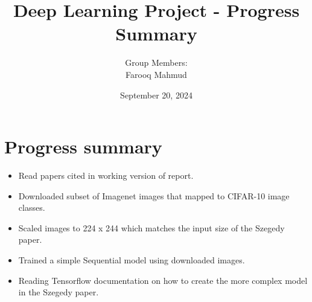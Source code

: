 \documentclass{article}
\title{Deep Learning Project - Progress Summary}
\author{
    Group Members: \\
    Farooq Mahmud
}
\date{September 20, 2024}
\begin{document}
\maketitle

\section{Progress summary}
\begin{itemize}
    \item Read papers cited in working version of report.
    \item Downloaded subset of Imagenet images that mapped to CIFAR-10 image classes. 
    \item Scaled images to 224 x 244 which matches the input size of the Szegedy paper.
    \item Trained a simple Sequential model using downloaded images.
    \item Reading Tensorflow documentation on how to create the more complex model in the Szegedy paper.
\end{itemize}
\end{document}
